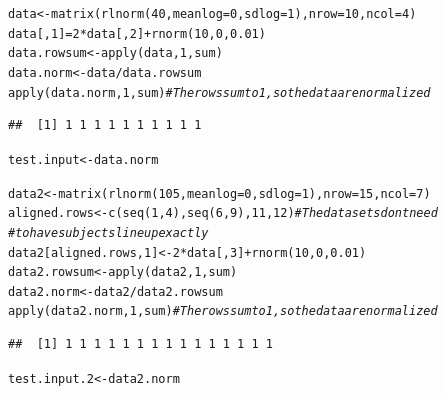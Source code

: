 \documentclass{article}\usepackage[]{graphicx}\usepackage[usenames,dvipsnames]{color}
\newcommand{\hlnum}[1]{\textcolor[rgb]{0.816,0.125,0.439}{#1}}%
\newcommand{\hlcom}[1]{\textcolor[rgb]{0.502,0.502,0.502}{\textit{#1}}}%
\newcommand{\hlopt}[1]{\textcolor[rgb]{0,0,0}{#1}}%
\newcommand{\hlstd}[1]{\textcolor[rgb]{0.251,0.251,0.251}{#1}}%
\newcommand{\hlkwb}[1]{\textcolor[rgb]{0,0,0}{#1}}%
\newcommand{\hlkwc}[1]{\textcolor[rgb]{0.251,0.251,0.251}{#1}}%
\newcommand{\hlkwd}[1]{\textcolor[rgb]{0.878,0.439,0.125}{#1}}%
\newenvironment{knitrout}{}{} %
\begin{document}
\begin{knitrout}
\color{fgcolor}\begin{kframe}
\begin{alltt}
\hlstd{data} \hlkwb{<-} \hlkwd{matrix}\hlstd{(}\hlkwd{rlnorm}\hlstd{(}\hlnum{40}\hlstd{,}\hlkwc{meanlog}\hlstd{=}\hlnum{0}\hlstd{,}\hlkwc{sdlog}\hlstd{=}\hlnum{1}\hlstd{),}\hlkwc{nrow}\hlstd{=}\hlnum{10}\hlstd{,}\hlkwc{ncol}\hlstd{=}\hlnum{4}\hlstd{)}
\hlstd{data[,}\hlnum{1}\hlstd{]} \hlkwb{=} \hlnum{2}\hlopt{*}\hlstd{data[,}\hlnum{2}\hlstd{]} \hlopt{+} \hlkwd{rnorm}\hlstd{(}\hlnum{10}\hlstd{,}\hlnum{0}\hlstd{,}\hlnum{0.01}\hlstd{)}
\hlstd{data.rowsum} \hlkwb{<-} \hlkwd{apply}\hlstd{(data,}\hlnum{1}\hlstd{,sum)}
\hlstd{data.norm} \hlkwb{<-} \hlstd{data}\hlopt{/}\hlstd{data.rowsum}
\hlkwd{apply}\hlstd{(data.norm,}\hlnum{1}\hlstd{,sum)}  \hlcom{# The rows sum to 1, so the data are normalized}
\end{alltt}
\begin{verbatim}
##  [1] 1 1 1 1 1 1 1 1 1 1
\end{verbatim}
\begin{alltt}
\hlstd{test.input} \hlkwb{<-} \hlstd{data.norm}


\hlstd{data2} \hlkwb{<-} \hlkwd{matrix}\hlstd{(}\hlkwd{rlnorm}\hlstd{(}\hlnum{105}\hlstd{,}\hlkwc{meanlog}\hlstd{=}\hlnum{0}\hlstd{,}\hlkwc{sdlog}\hlstd{=}\hlnum{1}\hlstd{),}\hlkwc{nrow}\hlstd{=}\hlnum{15}\hlstd{,}\hlkwc{ncol}\hlstd{=}\hlnum{7}\hlstd{)}
\hlstd{aligned.rows} \hlkwb{<-} \hlkwd{c}\hlstd{(}\hlkwd{seq}\hlstd{(}\hlnum{1}\hlstd{,}\hlnum{4}\hlstd{),}\hlkwd{seq}\hlstd{(}\hlnum{6}\hlstd{,}\hlnum{9}\hlstd{),}\hlnum{11}\hlstd{,}\hlnum{12}\hlstd{)}  \hlcom{# The datasets dont need }
                                            \hlcom{# to have subjects line up exactly}
\hlstd{data2[aligned.rows,}\hlnum{1}\hlstd{]} \hlkwb{<-}  \hlnum{2}\hlopt{*}\hlstd{data[,}\hlnum{3}\hlstd{]} \hlopt{+} \hlkwd{rnorm}\hlstd{(}\hlnum{10}\hlstd{,}\hlnum{0}\hlstd{,}\hlnum{0.01}\hlstd{)}
\hlstd{data2.rowsum} \hlkwb{<-} \hlkwd{apply}\hlstd{(data2,}\hlnum{1}\hlstd{,sum)}
\hlstd{data2.norm} \hlkwb{<-} \hlstd{data2}\hlopt{/}\hlstd{data2.rowsum}
\hlkwd{apply}\hlstd{(data2.norm,}\hlnum{1}\hlstd{,sum)}  \hlcom{# The rows sum to 1, so the data are normalized}
\end{alltt}
\begin{verbatim}
##  [1] 1 1 1 1 1 1 1 1 1 1 1 1 1 1 1
\end{verbatim}
\begin{alltt}
\hlstd{test.input.2} \hlkwb{<-} \hlstd{data2.norm}


\end{alltt}
\end{kframe}
\end{knitrout}
\end{document}
